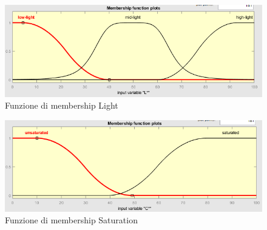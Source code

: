 \begin{figure}[!ht]
\begin{center}
	\includegraphics[scale=0.8]{images/rete2-membership-light.PNG}
\end{center}
\caption{Funzione di membership Light}
\label{fig:memblight}
\end{figure}

\begin{figure}[!ht]
\begin{center}
	\includegraphics[scale=0.8]{images/rete2-membership-saturation.PNG}
\end{center}
\caption{Funzione di membership Saturation}
\label{fig:membsaturation}
\end{figure}

